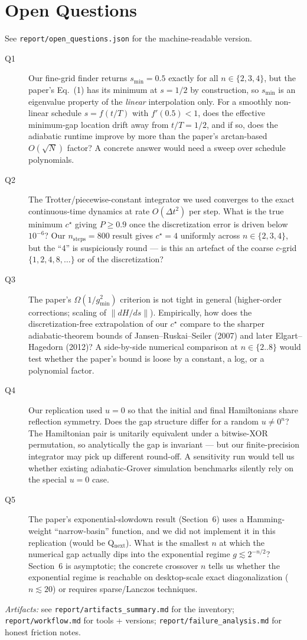 \documentclass[11pt]{article}
\begin{document}
\section*{Open Questions}
See \texttt{report/open\_questions.json} for the machine-readable
version.
\begin{description}
\item[Q1] Our fine-grid finder returns $s_{\min}=0.5$ exactly for all $n \in
      \{2,3,4\}$, but the paper's Eq.~(1) has its minimum at $s=1/2$ by
      construction, so $s_{\min}$ is an eigenvalue property of the
      \emph{linear} interpolation only. For a smoothly non-linear
      schedule $s = f(t/T)$ with $f'(0.5) < 1$, does the effective
      minimum-gap location drift away from $t/T=1/2$, and if so, does
      the adiabatic runtime improve by more than the paper's arctan-based
      $O(\sqrt{N})$ factor? A concrete answer would need a sweep over
      schedule polynomials.
\item[Q2] The Trotter/piecewise-constant integrator we used converges to
      the exact continuous-time dynamics at rate $O(\Delta t^2)$
      per step. What is the true minimum $c^\star$ giving $P \ge 0.9$
      once the discretization error is driven below $10^{-6}$? Our
      $n_{\mathrm{steps}}{=}800$ result gives $c^\star = 4$ uniformly across
      $n \in \{2,3,4\}$, but the ``4'' is suspiciously round --- is
      this an artefact of the coarse $c$-grid $\{1,2,4,8,\dots\}$ or
      of the discretization?
\item[Q3] The paper's $\Omega(1/g_{\min}^2)$ criterion is not tight in
      general (higher-order corrections; scaling of $\lVert dH/ds\rVert$).
      Empirically, how does the discretization-free extrapolation of
      our $c^\star$ compare to the sharper adiabatic-theorem bounds of
      Jansen--Ruskai--Seiler (2007) and later Elgart--Hagedorn (2012)? A
      side-by-side numerical comparison at $n \in \{2..8\}$ would test
      whether the paper's bound is loose by a constant, a log, or a
      polynomial factor.
\item[Q4] Our replication used $u=0$ so that the initial and final
      Hamiltonians share reflection symmetry. Does the gap structure
      differ for a random $u \ne 0^n$? The Hamiltonian pair is
      unitarily equivalent under a bitwise-XOR permutation, so
      analytically the gap is invariant --- but our finite-precision
      integrator may pick up different round-off. A sensitivity run
      would tell us whether existing adiabatic-Grover simulation
      benchmarks silently rely on the special $u=0$ case.
\item[Q5] The paper's exponential-slowdown result (Section~6) uses a
      Hamming-weight ``narrow-basin'' function, and we did not
      implement it in this replication (would be Q$_{\mathrm{next}}$).
      What is the smallest $n$ at which the numerical gap actually
      dips into the exponential regime $g \lesssim 2^{-n/2}$?
      Section~6 is asymptotic; the concrete crossover $n$ tells us
      whether the exponential regime is reachable on desktop-scale
      exact diagonalization ($n \lesssim 20$) or requires
      sparse/Lanczos techniques.
\end{description}

\bigskip\noindent\emph{Artifacts:} see \texttt{report/artifacts\_summary.md}
for the inventory; \texttt{report/workflow.md} for tools + versions;
\texttt{report/failure\_analysis.md} for honest friction notes.
\end{document}

